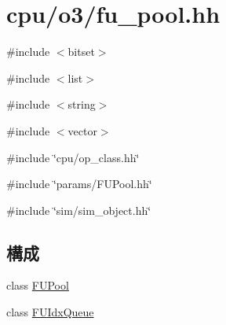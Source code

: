 \hypertarget{fu__pool_8hh}{
\section{cpu/o3/fu\_\-pool.hh}
\label{fu__pool_8hh}
}
{\ttfamily \#include $<$bitset$>$}\par
{\ttfamily \#include $<$list$>$}\par
{\ttfamily \#include $<$string$>$}\par
{\ttfamily \#include $<$vector$>$}\par
{\ttfamily \#include \char`\"{}cpu/op\_\-class.hh\char`\"{}}\par
{\ttfamily \#include \char`\"{}params/FUPool.hh\char`\"{}}\par
{\ttfamily \#include \char`\"{}sim/sim\_\-object.hh\char`\"{}}\par
\subsection*{構成}
\begin{DoxyCompactItemize}
\item 
class \hyperlink{classFUPool}{FUPool}
\item 
class \hyperlink{classFUPool_1_1FUIdxQueue}{FUIdxQueue}
\end{DoxyCompactItemize}
